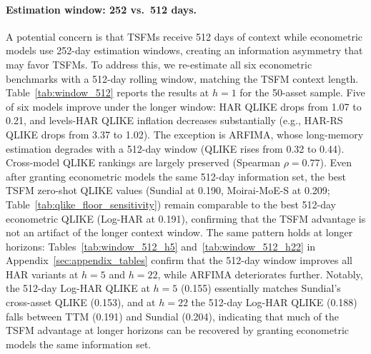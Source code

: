 \documentclass[12pt]{article}
\begin{document}
\paragraph{Estimation window: 252 vs.\ 512 days.}
A potential concern is that TSFMs receive 512 days of context while econometric models use 252-day estimation windows, creating an information asymmetry that may favor TSFMs. To address this, we re-estimate all six econometric benchmarks with a 512-day rolling window, matching the TSFM context length. Table~\ref{tab:window_512} reports the results at $h = 1$ for the 50-asset sample. Five of six models improve under the longer window: HAR QLIKE drops from 1.07 to 0.21, and levels-HAR QLIKE inflation decreases substantially (e.g., HAR-RS QLIKE drops from 3.37 to 1.02). The exception is ARFIMA, whose long-memory estimation degrades with a 512-day window (QLIKE rises from 0.32 to 0.44). Cross-model QLIKE rankings are largely preserved (Spearman $\rho = 0.77$). Even after granting econometric models the same 512-day information set, the best TSFM zero-shot QLIKE values (Sundial at 0.190, Moirai-MoE-S at 0.209; Table~\ref{tab:qlike_floor_sensitivity}) remain comparable to the best 512-day econometric QLIKE (Log-HAR at 0.191), confirming that the TSFM advantage is not an artifact of the longer context window. The same pattern holds at longer horizons: Tables~\ref{tab:window_512_h5} and~\ref{tab:window_512_h22} in Appendix~\ref{sec:appendix_tables} confirm that the 512-day window improves all HAR variants at $h = 5$ and $h = 22$, while ARFIMA deteriorates further. Notably, the 512-day Log-HAR QLIKE at $h = 5$ (0.155) essentially matches Sundial's cross-asset QLIKE (0.153), and at $h = 22$ the 512-day Log-HAR QLIKE (0.188) falls between TTM (0.191) and Sundial (0.204), indicating that much of the TSFM advantage at longer horizons can be recovered by granting econometric models the same information set.


\end{document}
